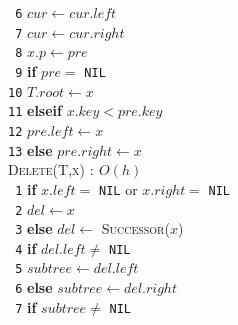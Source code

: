 \documentclass[10pt,landscape]{article}
\begin{document}
\begin{multicols*}{4}
\begin{multicols}{2}
                        \verb| 6|\hspace*{2.5em} $cur \leftarrow cur.left$\\
                        \verb| 7|\hspace*{1.5em} $cur \leftarrow cur.right$\\
                        \verb| 8|\hspace*{0.5em} $x.p \leftarrow pre$\\
                        \verb| 9|\hspace*{0.5em} \textbf{if} $pre =$ \verb|NIL|\\
                        \verb|10|\hspace*{1.5em} $T.root \leftarrow x$\\
                        \verb|11|\hspace*{0.5em} \textbf{elseif} $x.key < pre.key$\\
                        \verb|12|\hspace*{1.5em} $pre.left \leftarrow x$\\
                        \verb|13|\hspace*{0.5em} \textbf{else} $pre.right \leftarrow x$\\
                        \columnbreak
                        \textsc{Delete(T,x)} $:\ O(h)$ \\ [3pt]
                        \verb| 1|\hspace*{0.5em} \textbf{if} $x.left=$ \verb|NIL| or $x.right=$ \verb|NIL|\\
                        \verb| 2|\hspace*{1.5em} $del \leftarrow x$\\
                        \verb| 3|\hspace*{0.5em} \textbf{else} $del \leftarrow$ \textsc{Successor}($x$)\\
                        \verb| 4|\hspace*{0.5em} \textbf{if} $del.left \neq$ \verb|NIL|\\
                        \verb| 5|\hspace*{1.5em} $subtree \leftarrow del.left$\\
                        \verb| 6|\hspace*{0.5em} \textbf{else} $subtree \leftarrow del.right$\\
                        \verb| 7|\hspace*{0.5em} \textbf{if} $subtree \neq$ \verb|NIL|\\

\end{multicols}
\end{multicols*}
\end{document}
